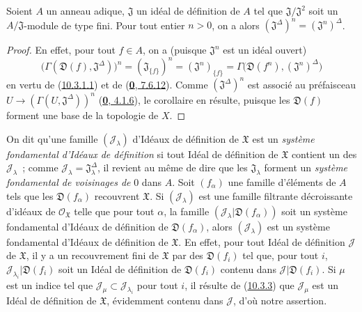 \begin{proposition}[10.3.6]
\label{I.10.3.6-fr}
Soient $A$ un anneau adique, $\mathfrak{J}$ un idéal de définition de $A$
tel que $\mathfrak{J}/\mathfrak{J}^2$ soit un
$A/\mathfrak{J}$-module de type fini. Pour tout entier $n>0$, on a alors
$(\mathfrak{J}^\Delta)^n=(\mathfrak{J}^n)^\Delta$.
\end{proposition}

\begin{proof}
En effet, pour tout $f\in A$, on a (puisque $\mathfrak{J}^n$ est un idéal
ouvert)
\[
  \bigl(\Gamma(\mathfrak{D}(f),\mathfrak{J}^\Delta)\bigr)^n
  =(\mathfrak{J}_{\{f\}})^n
  =(\mathfrak{J}^n)_{\{f\}}
  =\Gamma\bigl(\mathfrak{D}(f^n),(\mathfrak{J}^n)^\Delta\bigr)
\]
en vertu de (\hyperref[I.10.3.1.1-fr]{10.3.1.1}) et de
(\hyperref[0.7.6.12-fr]{\textbf{0}, 7.6.12}). Comme
$(\mathfrak{J}^\Delta)^n$ est associé au préfaisceau
$U\to(\Gamma(U,\mathfrak{J}^\Delta))^n$
(\hyperref[0.4.1.6-fr]{\textbf{0}, 4.1.6}), le corollaire en résulte, puisque les
$\mathfrak{D}(f)$ forment une base de la topologie de $X$.
\end{proof}

\begin{env}[10.3.7]
\label{I.10.3.7-fr}
On dit qu'une famille $(\mathscr{J}_\lambda)$ d'Idéaux de définition de
$\mathfrak{X}$ est un \emph{système fondamental d'Idéaux de définition}
si tout Idéal de définition de $\mathfrak{X}$ contient un des
$\mathscr{J}_\lambda$~; comme
$\mathscr{J}_\lambda=\mathfrak{J}_\lambda^\Delta$, il revient au même de
dire que les $\mathfrak{J}_\lambda$ forment un \emph{système fondamental
de voisinages de} 0 dans $A$. Soit $(f_\alpha)$ une famille d'éléments de
$A$ tels que les $\mathfrak{D}(f_\alpha)$ recouvrent $\mathfrak{X}$. Si
$(\mathscr{J}_\lambda)$ est une famille filtrante décroissante d'idéaux de
$\mathscr{O}_{\mathfrak{X}}$ telle que pour tout $\alpha$, la famille
$(\mathscr{J}_\lambda|\mathfrak{D}(f_\alpha))$ soit un système fondamental
d'Idéaux de définition de $\mathfrak{D}(f_\alpha)$, alors
$(\mathscr{J}_\lambda)$ est un système fondamental d'Idéaux de définition
de $\mathfrak{X}$. En effet, pour tout Idéal de définition $\mathscr{J}$
de $\mathfrak{X}$, il y a un recouvrement fini de $\mathfrak{X}$ par des
$\mathfrak{D}(f_i)$ tel que, pour tout $i$,
$\mathscr{J}_{\lambda_i}|\mathfrak{D}(f_i)$ soit un Idéal de définition
de $\mathfrak{D}(f_i)$ contenu dans
$\mathscr{J}|\mathfrak{D}(f_i)$. Si $\mu$ est un indice tel que
$\mathscr{J}_\mu\subset\mathscr{J}_{\lambda_i}$ pour tout $i$, il résulte
de (\hyperref[I.10.3.3-fr]{10.3.3}) que $\mathscr{J}_\mu$ est un Idéal de
définition de $\mathfrak{X}$, évidemment contenu dans $\mathscr{J}$, d'où
notre assertion.
\end{env}

